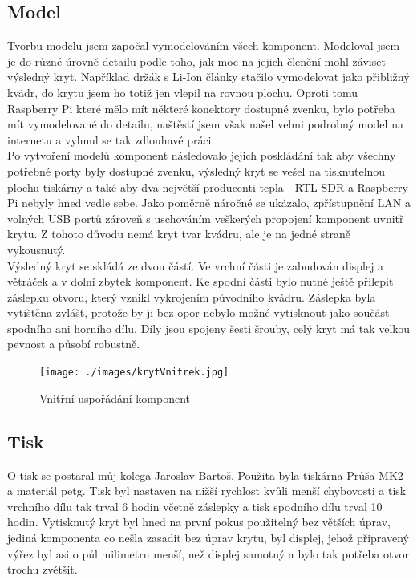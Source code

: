 \documentclass{ctuthesis}
\begin{document}
\subsection{Model}
Tvorbu modelu jsem započal vymodelováním všech komponent. Modeloval jsem je do různé úrovně detailu podle toho, jak moc na jejich členění mohl záviset výsledný kryt. Například držák s Li-Ion články stačilo vymodelovat jako přibližný kvádr, do krytu jsem ho totiž jen vlepil na rovnou plochu. Oproti tomu Raspberry Pi které mělo mít některé konektory dostupné zvenku, bylo potřeba mít vymodelované do detailu, naštěstí jsem však našel velmi podrobný model na internetu a vyhnul se tak zdlouhavé práci.\\
Po vytvoření modelů komponent následovalo jejich poskládání tak aby všechny potřebné porty byly dostupné zvenku, výsledný kryt se vešel na tisknutelnou plochu tiskárny a také aby dva největší producenti tepla - RTL-SDR a Raspberry Pi nebyly hned vedle sebe. Jako poměrně náročné se ukázalo, zpřístupnění LAN a volných USB portů zároveň s uschováním veškerých propojení komponent uvnitř krytu. Z tohoto důvodu nemá kryt tvar kvádru, ale je na jedné straně vykousnutý. \\
Výsledný kryt se skládá ze dvou částí. Ve vrchní části je zabudován displej a větráček a v dolní zbytek komponent. Ke spodní části bylo nutné ještě přilepit záslepku otvoru, který vznikl vykrojením původního kvádru. Záslepka byla vytištěna zvlášť, protože by ji bez opor nebylo možné vytisknout jako součást spodního ani horního dílu. Díly jsou spojeny šesti šrouby, celý kryt má tak velkou pevnost a působí robustně.

\begin{figure}
\caption{Vnitřní uspořádání komponent}
\texttt{[image: ./images/krytVnitrek.jpg]}
\label{caseVnitrek}
\end{figure}

\subsection{Tisk}
O tisk se postaral můj kolega Jaroslav Bartoš. Použita byla tiskárna Průša MK2 a materiál petg. Tisk byl nastaven na nižší rychlost kvůli menší chybovosti a tisk vrchního dílu tak trval 6 hodin včetně záslepky a tisk spodního dílu trval 10 hodin. Vytisknutý kryt byl hned na první pokus použitelný bez větších úprav, jediná komponenta co nešla zasadit bez úprav krytu, byl displej, jehož připravený výřez byl asi o půl milimetru menší, než displej samotný a bylo tak potřeba otvor trochu zvětšit.
\end{document}
